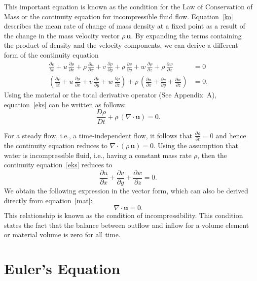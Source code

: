 \documentclass[12pt,a4paper]{report}
\begin{document}
This important equation is known as the condition for the Law of Conservation of Mass or the continuity equation for incompressible fluid flow.
Equation~\eqref{ko} describes the mean rate of change of mass density at a fixed point as a result of the change in the mass velocity vector $\rho \, \mathbf{u}$.
By expanding the terms containing the product of density and the velocity components, we can derive a different form of the continuity equation
\begin{align}
\frac{\partial \rho}{\partial t} + u\,\frac{\partial \rho}{\partial x} + \rho\, \frac{\partial u}{\partial x} + v \, \frac{\partial \rho}{\partial y} + 
\rho\,\frac{\partial v}{\partial y} + w \, \frac{\partial \rho}{\partial z} + \rho \,\frac{\partial w}{\partial z} &=0 \\
\left(\frac{\partial \rho}{\partial t} + u \,\frac{\partial \rho}{\partial x} + v\,\frac{\partial \rho}{\partial y} + w\,\frac{\partial \rho}{\partial z} \right) + 
\rho \, \left(\frac{\partial u}{\partial x} + \frac{\partial v}{\partial y} + \frac{\partial w}{\partial z} \right) &=0.  \label{eks}
\end{align}
Using the material or the total derivative operator (See Appendix~A), equation~\eqref{eks} can be written as follows:
\begin{equation}
\frac{D\rho}{Dt} + \rho \, (\nabla \cdot \mathbf{u}) = 0.  \label{mat}
\end{equation}

For a steady flow, i.e., a time-independent flow, it follows that $\frac{\partial \rho}{\partial t} = 0$ and hence the continuity equation reduces to 
$\nabla \cdot(\rho \, \mathbf{u}) = 0$. Using the assumption that water is incompressible fluid, i.e., having a constant mass rate $\rho$, then the continuity equation~\eqref{eks} reduces to
\begin{equation}
\frac{\partial u}{\partial x} + \frac{\partial v}{\partial y} + \frac{\partial w}{\partial z} = 0.
\end{equation}
We obtain the following expression in the vector form, which can also be derived directly from equation~\eqref{mat}:
\begin{equation}
\nabla \cdot \mathbf{u} = 0.  \label{vpk}
\end{equation}
This relationship is known as the condition of incompressibility. This condition states the fact that the balance between outflow and inflow for a volume element or material volume is zero for all time. 

\section{Euler's Equation}
\end{document}
